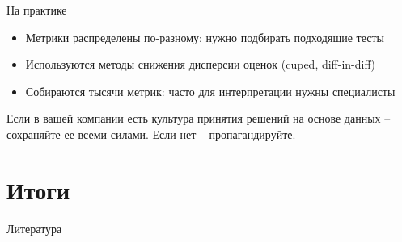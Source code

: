 \documentclass[11pt,aspectratio=169]{beamer}
\begin{document}
\begin{frame}{На практике}

\begin{itemize}
\item Метрики распределены по-разному: нужно подбирать подходящие тесты
\item Используются методы снижения дисперсии оценок (cuped, diff-in-diff)
\item Собираются тысячи метрик: часто для интерпретации нужны специалисты
\end{itemize}

\vfill

\begin{tcolorbox}[colback=info!5,colframe=info!80]
Если в вашей компании есть культура принятия решений на основе данных -- сохраняйте ее всеми силами. Если нет -- пропагандируйте.
\end{tcolorbox}

\end{frame}

\section{Итоги}

\begin{frame}[allowframebreaks]{Литература}




\end{frame}
\end{document}
